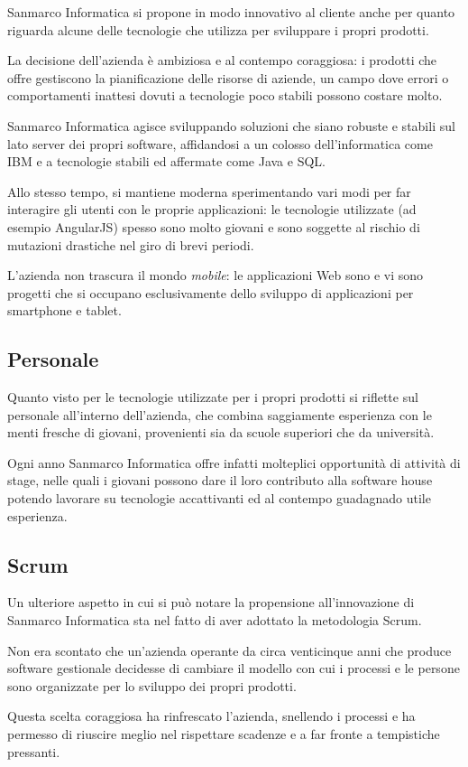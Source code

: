Sanmarco Informatica si propone in modo innovativo al cliente anche per quanto
riguarda alcune delle tecnologie che utilizza per sviluppare i propri prodotti.

La decisione dell'azienda è ambiziosa e al contempo coraggiosa: i prodotti che
offre gestiscono la pianificazione delle risorse di aziende, un campo dove
errori o comportamenti inattesi dovuti a tecnologie poco stabili possono
costare molto.

Sanmarco Informatica agisce sviluppando soluzioni che siano robuste e stabili
sul lato server dei propri software, affidandosi a un colosso dell'informatica
come IBM e a tecnologie stabili ed affermate come Java e SQL.

Allo stesso tempo, si mantiene moderna sperimentando vari modi per far
interagire gli utenti con le proprie applicazioni: le tecnologie utilizzate (ad
esempio AngularJS) spesso sono molto giovani e sono soggette al rischio di
mutazioni drastiche nel giro di brevi periodi.

L'azienda non trascura il mondo \emph{mobile}: le applicazioni Web sono
 e vi sono progetti che si occupano esclusivamente dello
sviluppo di applicazioni per smartphone e tablet.

\subsection{Personale} \mbox{}

Quanto visto per le tecnologie utilizzate per i propri prodotti si riflette sul
personale all'interno dell'azienda, che combina saggiamente esperienza con le
menti fresche di giovani, provenienti sia da scuole superiori che da
università.

Ogni anno Sanmarco Informatica offre infatti molteplici opportunità di attività
di stage, nelle quali i giovani possono dare il loro contributo alla software
house potendo lavorare su tecnologie accattivanti ed al contempo guadagnado
utile esperienza.

\subsection{Scrum} \mbox{}

Un ulteriore aspetto in cui si può notare la propensione all'innovazione di
Sanmarco Informatica sta nel fatto di aver adottato la metodologia Scrum.

Non era scontato che un'azienda operante da circa venticinque anni che produce
software gestionale decidesse di cambiare il modello con cui i processi e le
persone sono organizzate per lo sviluppo dei propri prodotti.

Questa scelta coraggiosa ha rinfrescato l'azienda, snellendo i processi e ha
permesso di riuscire meglio nel rispettare scadenze e a far fronte a
tempistiche pressanti.

